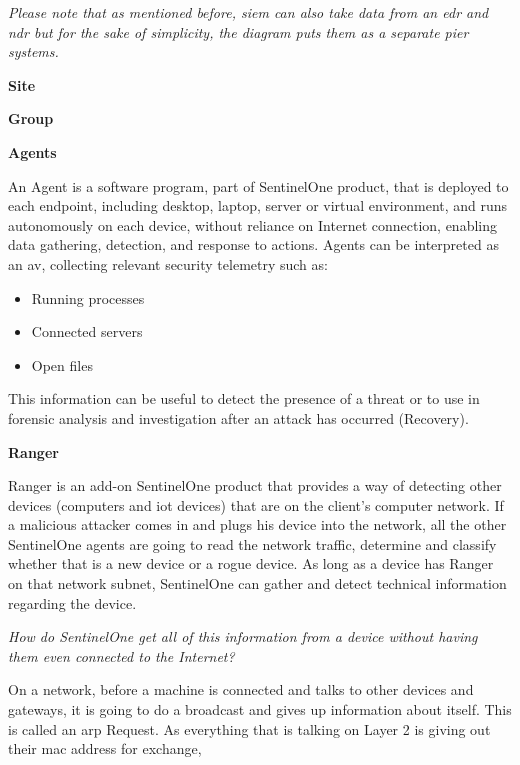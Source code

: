 \begin{multicols}{2}
      \textit{Please note that as mentioned before, \acrshort{siem} can also take data from an \acrshort{edr} and \acrshort{ndr} but for
            the sake of simplicity, the diagram puts them as a separate pier systems.}

      \textbf{Site}

      \textbf{Group}

      \textbf{Agents}

      An Agent is a software program, part of SentinelOne product, that is deployed to each endpoint, including desktop, laptop,
      server or virtual environment, and runs autonomously on each device, without reliance on Internet connection, enabling data
      gathering, detection, and response to actions. Agents can be interpreted as an \acrshort{av}, collecting relevant security
      telemetry such as:
      \begin{itemize}
            \item Running processes
            \item Connected servers
            \item Open files
      \end{itemize}
      This information can be useful to detect the presence of a threat or to use in forensic analysis and investigation after
      an attack has occurred (Recovery).

      \textbf{Ranger}

      Ranger is an add-on SentinelOne product that provides a way of detecting other devices (computers and
      \acrshort{iot} devices) that are on the client's computer network. If a malicious attacker comes in and plugs his device
      into the network, all the other SentinelOne agents are going to read the network traffic, determine and classify whether
      that is a new device or a rogue device. As long as a device has Ranger on that network subnet, SentinelOne can gather and
      detect technical information regarding the device.

      \textit{How do SentinelOne get all of this information from a device without having them even connected to the Internet?}

      On a network, before a machine is connected and talks to other devices
      and gateways, it is going to do a broadcast and gives up information about itself. This is called an \acrshort{arp} Request.
      As everything that is talking on Layer 2 is giving out their \acrshort{mac} address for exchange,


\end{multicols}
